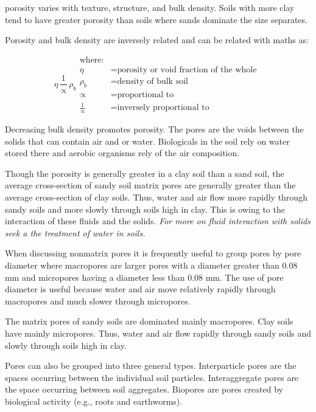 \documentclass[a5paper]{book}
\begin{document}
porosity varies with texture, structure, and bulk density. Soils with more clay tend to have greater porosity than soils where sands dominate the size separates. 

Porosity and bulk density are inversely related and can be related with maths as:

\begin{equation}
    \eta \, \frac{1}{\propto} \, \rho_b
    \begin{aligned}
        \text{where:}\\
        \eta &= \text{porosity or void fraction of the whole }\\
        \rho_b &= \text{density of bulk soil}\\
        \propto &= \text{proportional to}\\
        \frac{1}{\propto} &= \text{inversely proportional to}
    \end{aligned}
\end{equation}

Decreasing bulk density promotes porosity. The pores are the voids between the solids that can contain air and or water. Biologicals in the soil rely on water stored there and aerobic organisms rely of the air composition.


Though the porosity is generally greater in a clay soil than a sand soil, the average cross-section of sandy soil matrix pores are generally greater than the average cross-section of clay soils. Thus, water and air flow more rapidly through sandy soils and more slowly through soils high in clay. This is owing to the interaction of these fluids and the solids. \textit{For more on fluid interaction with solids seek a the treatment of water in soils.}

When discussing nonmatrix pores it is frequently useful to group pores by pore diameter where macropores are larger pores with a diameter greater than 0.08 mm and micropores having a diameter less than 0.08 mm. The use of pore diameter is useful because water and air move relatively rapidly through macropores and much slower through micropores. 

The matrix pores of sandy soils are dominated mainly macropores. Clay soils have mainly micropores. Thus, water and air flow rapidly through sandy soils and slowly through soils high in clay.

Pores can also be grouped into three general types. Interparticle pores are the spaces occurring between the individual soil particles. Interaggregate pores are the space occurring between soil aggregates. Biopores are pores created by biological activity (e.g., roots and earthworms).
\end{document}
